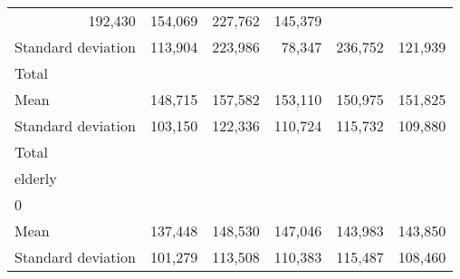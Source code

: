 \begin{tabular}{llllll}
  \multicolumn{1}{r}{192,430} &
  \multicolumn{1}{r}{154,069} &
  \multicolumn{1}{r}{227,762} &
  \multicolumn{1}{r}{145,379} \\
\multicolumn{1}{l}{\hspace{4em}Standard deviation} &
  \multicolumn{1}{|r}{113,904} &
  \multicolumn{1}{r}{223,986} &
  \multicolumn{1}{r}{78,347} &
  \multicolumn{1}{r}{236,752} &
  \multicolumn{1}{r}{121,939} \\
\multicolumn{1}{l}{\hspace{3em}Total} &
  \multicolumn{1}{|r}{} &
  \multicolumn{1}{r}{} &
  \multicolumn{1}{r}{} &
  \multicolumn{1}{r}{} &
  \multicolumn{1}{r}{} \\
\multicolumn{1}{l}{\hspace{4em}Mean} &
  \multicolumn{1}{|r}{148,715} &
  \multicolumn{1}{r}{157,582} &
  \multicolumn{1}{r}{153,110} &
  \multicolumn{1}{r}{150,975} &
  \multicolumn{1}{r}{151,825} \\
\multicolumn{1}{l}{\hspace{4em}Standard deviation} &
  \multicolumn{1}{|r}{103,150} &
  \multicolumn{1}{r}{122,336} &
  \multicolumn{1}{r}{110,724} &
  \multicolumn{1}{r}{115,732} &
  \multicolumn{1}{r}{109,880} \\
\multicolumn{1}{l}{\hspace{1em}Total} &
  \multicolumn{1}{|r}{} &
  \multicolumn{1}{r}{} &
  \multicolumn{1}{r}{} &
  \multicolumn{1}{r}{} &
  \multicolumn{1}{r}{} \\
\multicolumn{1}{l}{\hspace{2em}elderly} &
  \multicolumn{1}{|r}{} &
  \multicolumn{1}{r}{} &
  \multicolumn{1}{r}{} &
  \multicolumn{1}{r}{} &
  \multicolumn{1}{r}{} \\
\multicolumn{1}{l}{\hspace{3em}0} &
  \multicolumn{1}{|r}{} &
  \multicolumn{1}{r}{} &
  \multicolumn{1}{r}{} &
  \multicolumn{1}{r}{} &
  \multicolumn{1}{r}{} \\
\multicolumn{1}{l}{\hspace{4em}Mean} &
  \multicolumn{1}{|r}{137,448} &
  \multicolumn{1}{r}{148,530} &
  \multicolumn{1}{r}{147,046} &
  \multicolumn{1}{r}{143,983} &
  \multicolumn{1}{r}{143,850} \\
\multicolumn{1}{l}{\hspace{4em}Standard deviation} &
  \multicolumn{1}{|r}{101,279} &
  \multicolumn{1}{r}{113,508} &
  \multicolumn{1}{r}{110,383} &
  \multicolumn{1}{r}{115,487} &
  \multicolumn{1}{r}{108,460} \\

\end{tabular}
